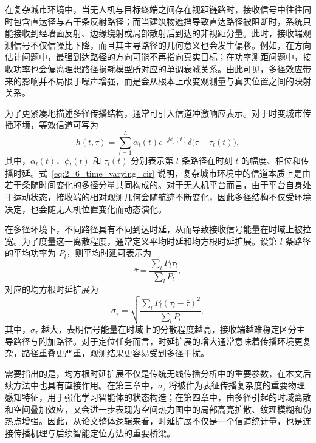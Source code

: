 在复杂城市环境中，当无人机与目标终端之间存在视距链路时，接收信号中往往同时包含直达径与若干条反射路径；而当建筑物遮挡导致直达路径被阻断时，系统只能接收到经墙面反射、边缘绕射或局部散射后到达的非视距分量。此时，接收端观测信号不仅信噪比下降，而且其主导路径的几何意义也会发生偏移。例如，在方向估计问题中，最强到达路径的方向可能不再指向真实目标；在功率测距问题中，接收功率也会偏离理想路径损耗模型所对应的单调衰减关系。由此可见，多径效应带来的影响并不局限于噪声增强，而是会从根本上改变观测量与真实位置之间的映射关系。

为了更紧凑地描述多径传播结构，通常可引入信道冲激响应表示。对于时变城市传播环境，等效信道可写为
\begin{equation}
h(t,\tau)
=
\sum_{l=1}^{L}
\alpha_l(t)
e^{-j\phi_l(t)}
\delta\big(\tau-\tau_l(t)\big),
\label{eq:2_6_time_varying_cir}
\end{equation}
其中，$\alpha_l(t)$、$\phi_l(t)$ 和 $\tau_l(t)$ 分别表示第 $l$ 条路径在时刻 $t$ 的幅度、相位和传播时延。式~\eqref{eq:2_6_time_varying_cir} 说明，复杂城市环境中的信道本质上是由若干条随时间变化的多径分量共同构成的。对于无人机平台而言，由于平台自身处于运动状态，接收端的相对观测几何会随航迹不断变化，因此多径结构不仅受环境决定，也会随无人机位置变化而动态演化。

在多径环境下，不同路径具有不同到达时延，从而导致接收信号能量在时域上被拉宽。为了度量这一离散程度，通常定义平均时延和均方根时延扩展。设第 $l$ 条路径的平均功率为 $P_l$，则平均时延可表示为
\begin{equation}
\bar{\tau}
=
\frac{\sum_{l} P_l \tau_l}{\sum_{l} P_l},
\label{eq:2_7_mean_delay}
\end{equation}
对应的均方根时延扩展为
\begin{equation}
\sigma_{\tau}
=
\sqrt{
\frac{\sum_{l} P_l(\tau_l-\bar{\tau})^2}{\sum_{l} P_l}
},
\label{eq:2_8_rms_delay_spread}
\end{equation}
其中，$\sigma_{\tau}$ 越大，表明信号能量在时域上的分散程度越高，接收端越难稳定区分主导路径与附加路径。对于定位任务而言，时延扩展的增大通常意味着传播环境更复杂，路径重叠更严重，观测结果更容易受到多径干扰。

需要指出的是，均方根时延扩展不仅是传统无线传播分析中的重要参数，在本文后续方法中也具有直接作用。在第三章中，$\sigma_{\tau}$ 将被作为表征传播复杂度的重要物理感知特征，用于强化学习智能体的状态构造；在第四章中，由多径引起的时域离散和空间叠加效应，又会进一步表现为空间热力图中的局部高亮扩散、纹理模糊和伪热点增强。因此，从论文整体逻辑来看，时延扩展不仅是一个信道统计量，也是连接传播机理与后续智能定位方法的重要桥梁。

